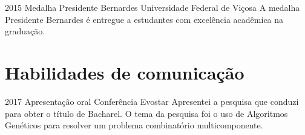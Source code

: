 \documentclass[a4paper]{cv-friggeri-x}
\begin{document}
\begin{entrylist}


\entry
    {2015}
    {Medalha Presidente Bernardes}
    {Universidade Federal de Vi\c cosa}
    {A medalha Presidente Bernardes é entregue a estudantes com excelência acadêmica na graduação.}


\end{entrylist}


\section{Habilidades de comunicação}

\begin{entrylist}


\entry
{2017}
{Apresentação oral}
{Conferência Evostar}
{Apresentei a pesquisa que conduzi para obter o título de Bacharel. O tema da pesquisa foi o uso de Algoritmos Genéticos para resolver um problema combinatório multicomponente.}


\end{entrylist}




\end{document}

